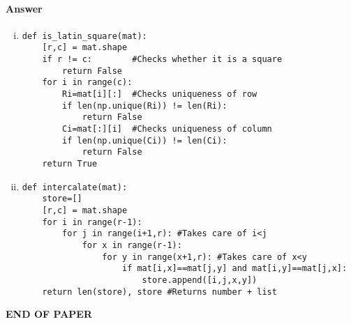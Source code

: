 \documentclass[12pt]{article}
\begin{document}
\paragraph{Answer}
\begin{enumerate}[(i)]
\item \begin{verbatim}
def is_latin_square(mat):
    [r,c] = mat.shape
    if r != c:        #Checks whether it is a square
        return False
    for i in range(c):
        Ri=mat[i][:]  #Checks uniqueness of row
        if len(np.unique(Ri)) != len(Ri):
            return False
        Ci=mat[:][i]  #Checks uniqueness of column
        if len(np.unique(Ci)) != len(Ci):
            return False
    return True
\end{verbatim}
\item \begin{verbatim}
def intercalate(mat):
    store=[]
    [r,c] = mat.shape
    for i in range(r-1):
        for j in range(i+1,r): #Takes care of i<j
            for x in range(r-1):
                for y in range(x+1,r): #Takes care of x<y
                    if mat[i,x]==mat[j,y] and mat[i,y]==mat[j,x]:
                        store.append([i,j,x,y])
    return len(store), store #Returns number + list            
\end{verbatim}
\end{enumerate}
\bigskip
\vfill
\begin{center}{\bf END OF PAPER}\end{center}
\end{document}
